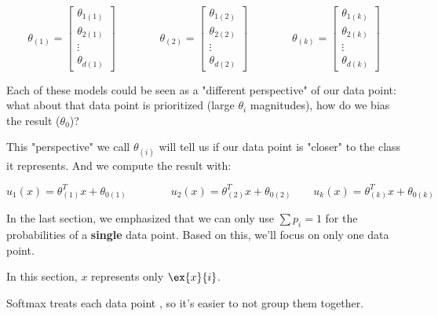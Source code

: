         \begin{equation}
            \theta_{(1)} = 
            \begin{bmatrix}
                \theta_{1(1)} \\ \theta_{2(1)} \\ \vdots \\ \theta_{d(1)}
            \end{bmatrix}
            \qquad\qquad
            \theta_{(2)} = 
            \begin{bmatrix}
                \theta_{1(2)} \\ \theta_{2(2)} \\ \vdots \\ \theta_{d(2)}
            \end{bmatrix}
            \qquad\qquad
            \theta_{(k)} = 
            \begin{bmatrix}
                \theta_{1(k)} \\ \theta_{2(k)} \\ \vdots \\ \theta_{d(k)}
            \end{bmatrix}
        \end{equation}
        
        Each of these models could be seen as a "different perspective" of our data point: what about that data point is prioritized (large $\theta_i$ magnitudes), how do we bias the result ($\theta_0$)?
        
        This "perspective" we call $\theta_{(i)}$ will tell us if our data point is "closer" to the class it represents. And we compute the result with:
        
        \begin{equation}
            u_1(x) = \theta_{(1)}^T x + \theta_{0(1)}
            \qquad\qquad
            u_2(x) = \theta_{(2)}^T x + \theta_{0(2)}
            \quad \quad
            u_k(x) = \theta_{(k)}^T x + \theta_{0(k)}
        \end{equation}

        In the last section, we emphasized that we can only use $\sum p_i=1$ for the probabilities of a \textbf{single} data point. Based on this, we'll focus on only one data point.

        \begin{clarification}
            In this section, $x$ represents only  $\ex{x}{i}$.

            Softmax treats each data point , so it's easier to not group them together. 
        \end{clarification}
        
